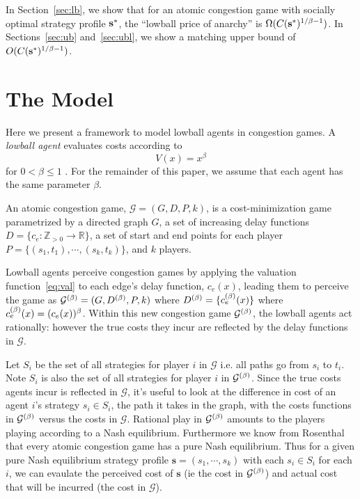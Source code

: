 \documentclass[twoside]{article}
\begin{document}
\begin{multicols}{2}
In Section~\ref{sec:lb}, we show that for an atomic congestion game with
socially optimal strategy profile $\mathbf{s}^*$, the ``lowball price of anarchy'' is
$\Omega(C(\mathbf{s}^*)^{1/\beta-1})$. In Sections~\ref{sec:ub} and~\ref{sec:ubl}, we
show a matching upper bound of $O(C(\mathbf{s}^*)^{1/\beta - 1})$.

\section{The Model}

Here we present a framework to model lowball agents in congestion games. A
\textit{lowball agent} evaluates costs according to
\begin{equation}
  V(x) = x^{\beta}
  \label{eq:val}
\end{equation}
for $0 < \beta \le 1$ \cite{Rieger2008}. For the remainder of this paper, we
assume that each agent has the same parameter $\beta$.

An atomic congestion game, $\mathcal{G} = (G, D, P, k)$, is a
cost-minimization game parametrized by a directed graph $G$, a set of increasing
delay functions $D = \{c_e : \mathbb{Z}_{>0} \to \mathbb{R}\}$, a set of start
and end points for each player $P =\{(s_1, t_1), \cdots, (s_k, t_k)\}$, and $k$
players.

Lowball agents perceive congestion games by applying the valuation
function~\eqref{eq:val} to each edge's delay function, $c_e(x)$, leading them to
perceive the game as $\mathcal{G}^{(\beta)}= (G, D^{(\beta)}, P, k)$ where $D^{(\beta)} =
\{c_e^{(\beta)}(x)\}$ where $c_e^{(\beta)}(x) = (c_e(x))^\beta$. Within this new
congestion game $\mathcal{G}^{(\beta)}$, the lowball agents act rationally: however
the true costs they incur are reflected by the delay functions in $\mathcal{G}$.   

Let $S_i$ be the set of all strategies for player $i$ in $\mathcal{G}$ i.e. all
paths go from $s_i$ to $t_i$.  Note $S_i$ is also the set of all strategies for
player $i$ in $\mathcal{G}^{(\beta)}$.  Since the true costs agents incur is
reflected in $\mathcal{G}$, it's useful to look at the difference in cost of an
agent $i$'s strategy $s_i \in S_i$, the path it takes in the graph, with the
costs functions in $\mathcal{G}^{(\beta)}$ versus the costs in $\mathcal{G}$.
Rational play in $\mathcal{G}^{(\beta)}$ amounts to the players playing according to
a Nash equilibrium.  Furthermore we know from Rosenthal \cite{Rosenthal1973}
that every atomic congestion game has a pure Nash equilibrium.  Thus for a given
pure Nash equilibrium strategy profile $\mathbf{s} = (s_1, \cdots, s_k)$ with
each $s_i \in S_i$ for each $i$, we can evaulate the perceived cost of
$\mathbf{s}$ (ie the cost in $\mathcal{G}^{(\beta)}$) and actual cost that will be
incurred (the cost in $\mathcal{G}$).


\end{multicols}
\end{document}
